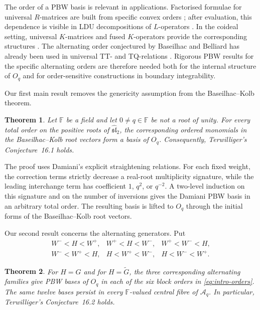 \documentclass[11pt]{extarticle}
\newtheorem{theorem}{Theorem}[section]
\theoremstyle{definition}
\theoremstyle{remark}
\numberwithin{equation}{section}
\newcommand{\F}{\mathbb F}
\newcommand{\Oq}{O_q}
\newcommand{\Aq}{\mathcal A_q}
\begin{document}
The order of a PBW basis is relevant in applications.  Factorised formulae
for universal $R$-matrices are built from specific convex orders
\cite{Beck1994,KhoroshkinTolstoy1991,Damiani1998}; after evaluation, this dependence
is visible in LDU decompositions of $L$-operators
\cite[eqs.~(4.8) and~(4.9)]{DingFrenkel1993}.  In the coideal setting,
universal $K$-matrices and fused $K$-operators provide the corresponding
structures \cite{AppelVlaar2022,LemartheBaseilhacGainutdinov2026}.  The
alternating order conjectured by Baseilhac and Belliard has already been
used in universal TT- and TQ-relations
\cite{BaseilhacGainutdinovLemarthe2026}.  Rigorous PBW results for the
specific alternating orders are therefore needed both for the internal
structure of $\Oq$ and for order-sensitive constructions in boundary
integrability.

Our first main result removes the genericity assumption from the
Baseilhac--Kolb theorem.

\begin{theorem}
\label{thm:intro-root}
Let $\F$ be a field and let $0\neq q\in\F$ be not a root of unity.  For every
total order on the positive roots of $\widehat{\mathfrak{sl}}_2$, the
corresponding ordered monomials in the Baseilhac--Kolb root vectors form a
basis of $\Oq$.  Consequently, Terwilliger's Conjecture~16.1 holds.
\end{theorem}

The proof uses Damiani's explicit straightening relations.  For each fixed
weight, the correction terms strictly decrease a real-root multiplicity
signature, while the leading interchange term has coefficient
$1$, $q^2$, or $q^{-2}$.  A two-level induction on this signature and on the
number of inversions gives the Damiani PBW basis in an arbitrary total order.
The resulting basis is lifted to $\Oq$ through the initial forms of the
Baseilhac--Kolb root vectors.

Our second result concerns the alternating generators.  Put
\[
\begin{array}{lll}
W^-<H<W^+,&W^+<H<W^-,&W^+<W^-<H,\\[1mm]
W^-<W^+<H,&H<W^+<W^-,&H<W^-<W^+.
\end{array}
\tag{1.1}
\label{eq:intro-orders}
\]

\begin{theorem}
\label{thm:intro-alternating}
For $H=G$ and for $H=\widetilde G$, the three corresponding alternating
families give PBW bases of $\Oq$ in each of the six block orders in
\eqref{eq:intro-orders}.  The same twelve bases persist in every $\F$-valued
central fibre of $\Aq$.  In particular, Terwilliger's Conjecture~16.2 holds.
\end{theorem}
\end{document}
